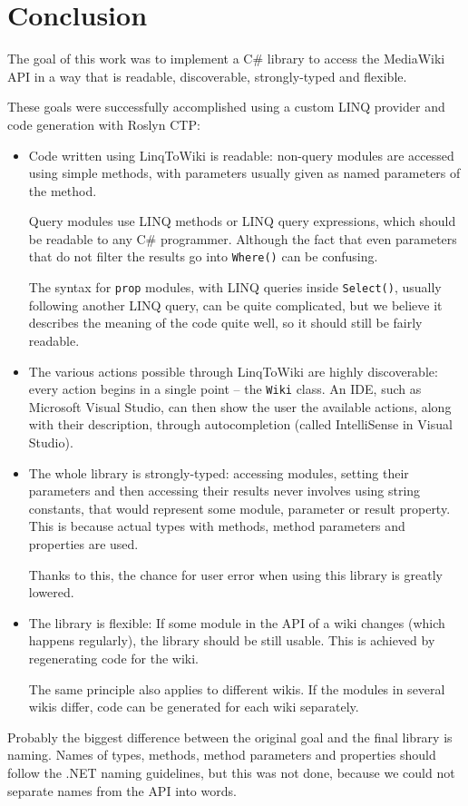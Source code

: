 \chapter*{Conclusion}

The goal of this work was to implement a C\# library to access the MediaWiki \ac{API}
in a way that is readable, discoverable, strongly-typed and flexible.

These goals were successfully accomplished using a custom \acs{LINQ} provider and code generation with Roslyn \ac{CTP}:

\begin{itemize}
\item Code written using LinqToWiki is readable:
non-query modules are accessed using simple methods,
with parameters usually given as named parameters of the method.

Query modules use \acs{LINQ} methods or \acs{LINQ} query expressions,
which should be readable to any C\# programmer.
Although the fact that even parameters that do not filter the results go into \lstinline{Where()} can be confusing.

The syntax for \texttt{prop} modules, with \acs{LINQ} queries inside \lstinline{Select()},
usually following another \acs{LINQ} query, can be quite complicated,
but we believe it describes the meaning of the code quite well,
so it should still be fairly readable.

\item The various actions possible through LinqToWiki are highly discoverable:
every action begins in a single point – the \lstinline{Wiki} class.
An \ac{IDE}, such as Microsoft Visual Studio,
can then show the user the available actions, along with their description,
through autocompletion (called IntelliSense in Visual Studio).

\item The whole library is strongly-typed:
accessing modules, setting their parameters and then accessing their results
never involves using string constants,
that would represent some module, parameter or result property.
This is because actual types with methods, method parameters and properties are used.

Thanks to this, the chance for user error when using this library is greatly lowered.

\item The library is flexible: If some module in the \ac{API} of a wiki changes
(which happens regularly), the library should be still usable.
This is achieved by regenerating code for the wiki.

The same principle also applies to different wikis.
If the modules in several wikis differ, code can be generated for each wiki separately.
\end{itemize}

\medskip

Probably the biggest difference between the original goal and the final library is naming.
Names of types, methods, method parameters and properties should follow the .NET naming guidelines,
but this was not done, because we could not separate names from the \ac{API} into words.

